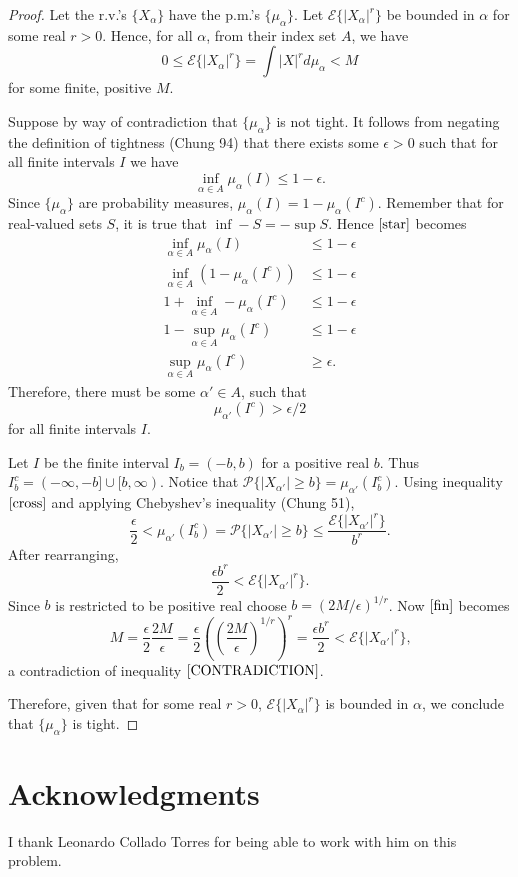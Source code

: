 \documentclass[letterpaper,12pt]{article}
\newcommand{\E}{\mathscr{E}}
\newcommand{\p}{\mathscr{P}}
\newcommand{\ap}{{\alpha'}}
\begin{document}
\begin{proof}
Let the r.v.'s $\{X_\alpha \}$ have the p.m.'s $\{\mu_\alpha \}$.
Let $\E\{|X_\alpha|^r\}$ be bounded in $\alpha$ for some real $r > 0$. 
Hence, for all $\alpha$, from their index set $A$, we have
\begin{equation} \label{CONTRADICTION}
0 \leq \E\{|X_\alpha|^r\} = \int |X|^r d \mu_\alpha < M
\end{equation}
for some finite, positive $M$.

Suppose by way of contradiction that $\{\mu_\alpha \}$ is not tight.
It follows from negating the definition of tightness (Chung 94) that there exists some $\epsilon > 0$ such that for all finite intervals $I$ we have
\begin{equation} 
\label{star}
\inf_{\alpha \in A} \mu_\alpha(I) \leq 1 - \epsilon 
\text{.}
\end{equation}
Since $\{\mu_\alpha \}$ are probability measures, $\mu_\alpha(I) = 1 - \mu_\alpha(I^c)$. Remember that for real-valued sets $S$, it is true that $\inf -S = - \sup S$. 
Hence $\eqref{star}$ becomes
\begin{align*}
\inf_{\alpha \in A} \mu_\alpha(I) &\leq 1 - \epsilon \\
\inf_{\alpha \in A} (1 - \mu_\alpha(I ^ c)) &\leq 1 - \epsilon \\
1 + \inf_{\alpha \in A} - \mu_\alpha(I ^ c) &\leq 1 - \epsilon \\
1 - \sup_{\alpha \in A} \mu_\alpha(I^c)  &\leq 1 - \epsilon \\
\sup_{\alpha \in A} \mu_\alpha(I^c)  &\geq \epsilon
\text{.}
\end{align*}
Therefore, there must be some $\ap \in A$, such that 
\begin{equation} 
\label{cross}
\mu_{\ap}(I^c) > \epsilon/2
\end{equation}
for all finite intervals $I$.

Let $I$ be the finite interval $I_b = (-b,b)$ for a positive real $b$. 
Thus $I_b^c = (-\infty, -b] \cup [b, \infty)$. 
Notice that $\p\{|X_\ap| \geq b \} = \mu_\ap(I_b^c)$.
Using inequality $\eqref{cross}$ and applying Chebyshev's inequality (Chung 51),
\[
\frac{\epsilon}{2} <\mu_\ap(I_b^c) = \p\{|X_\ap| \geq b \} \leq \frac{\E \{|X_\ap|^r \}}{b^r}
\text{.}
\]
After rearranging,
\begin{equation}
\label{fin}
\frac{\epsilon b^r}{2} < \E \{|X_\ap|^r \} 
\text{.}
\end{equation}
Since $b$ is restricted to be positive real choose $b = (2M / \epsilon)^{1/r}$. 
Now $\eqref{fin}$ becomes
\[
M  
= \frac{\epsilon}{2}\frac{2M}{\epsilon} 
= \frac{\epsilon}{2} \left(\left(\frac{2M}{\epsilon}\right)^{1/r}\right)^r
= \frac{\epsilon b^r}{2} 
< \E \{|X_\ap|^r \} 
\text{,}
\]
a contradiction of inequality $\eqref{CONTRADICTION}$.

Therefore, given that for some real $r > 0$, $\E\{|X_\alpha|^r\}$ is bounded in $\alpha$, we conclude that $\{\mu_\alpha \}$ is tight. 
\end{proof}

\section*{Acknowledgments}
I thank Leonardo Collado Torres for being able to work with him on this problem.
\end{document}
